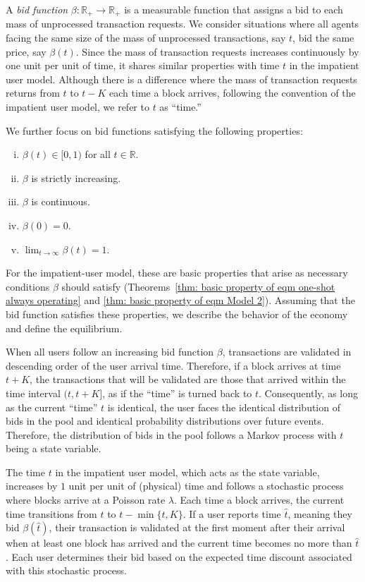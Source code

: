\documentclass[12pt, letterpaper]{article}
\begin{document}
A \emph{bid function} $\beta: \mathbb{R}_+ \to \mathbb{R}_+$ is a measurable function that assigns a bid to each mass of unprocessed transaction requests. We consider situations where all agents facing the same size of the mass of unprocessed transactions, say $t$, bid the same price, say $\beta(t)$. 
Since the mass of transaction requests increases continuously by one unit per unit of time, it shares similar properties with time $t$ in the impatient user model. Although there is a difference where the mass of transaction requests returns from $t$ to $t - K$ each time a block arrives, following the convention of the impatient user model, we refer to $t$ as ``time.''




We further focus on bid functions satisfying the following properties:
\begin{enumerate}[(i)]
    \item $\beta(t) \in [0, 1)$ for all $t \in \mathbb{R}$.
    \item $\beta$ is strictly increasing.
    \item $\beta$ is continuous.
    \item $\beta(0) = 0$.
    \item $\lim_{t \to \infty} \beta(t) = 1$.
\end{enumerate}
For the impatient-user model, these are basic properties that arise as necessary conditions $\beta$ should satisfy (Theorems~\ref{thm: basic property of eqm one-shot always operating} and \ref{thm: basic property of eqm Model 2}). Assuming that the bid function satisfies these properties, we describe the behavior of the economy and define the equilibrium.


When all users follow an increasing bid function $\beta$, transactions are validated in descending order of the user arrival time. Therefore, if a block arrives at time $t + K$, the transactions that will be validated are those that arrived within the time interval $(t, t + K]$, as if the ``time'' is turned back to $t$. Consequently, as long as the current ``time'' $t$ is identical, the user faces the identical distribution of bids in the pool and identical probability distributions over future events. Therefore, the distribution of bids in the pool follows a Markov process with $t$ being a state variable.

The time $t$ in the impatient user model, which acts as the state variable, increases by $1$ unit per unit of (physical) time and follows a stochastic process where blocks arrive at a Poisson rate $\lambda$. Each time a block arrives, the current time transitions from $t$ to $t - \min\{t, K\}$. If a user reports time $\hat{t}$, meaning they bid $\beta(\hat{t})$, their transaction is validated at the first moment after their arrival when at least one block has arrived and the current time becomes no more than $\hat{t}$. Each user determines their bid based on the expected time discount associated with this stochastic process.
\end{document}
